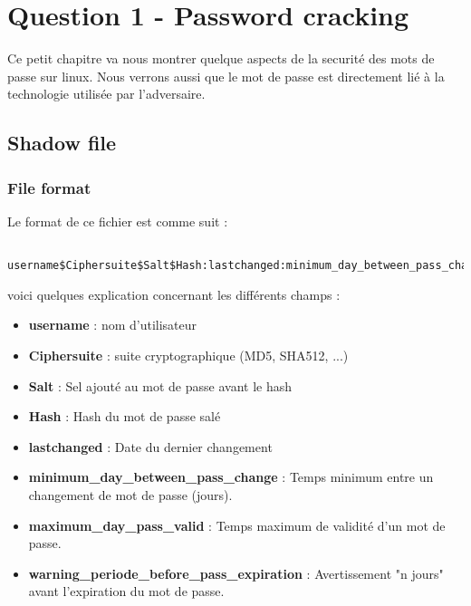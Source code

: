 
\chapter{Question 1 - Password cracking} %

\label{Chapitre 7.1} %



Ce petit chapitre va nous montrer quelque aspects de la securité des mots de passe sur linux. Nous verrons aussi que le mot de passe est directement lié à la technologie utilisée par l'adversaire.

\section{Shadow file}
\subsection{File format}
Le format de ce fichier est comme suit :
\begin{lstlisting}[frame=single,style=Console]  % Start your code-block

username$Ciphersuite$Salt$Hash:lastchanged:minimum_day_between_pass_change:maximum_day_pass_valid:warning_periode_before_pass_expiration:::
\end{lstlisting}

voici quelques explication concernant les différents champs :

\begin{itemize}
\item \textbf{username} : nom d'utilisateur
\item \textbf{Ciphersuite} : suite cryptographique (MD5, SHA512, ...)
\item \textbf{Salt} : Sel ajouté au mot de passe avant le hash
\item \textbf{Hash} : Hash du mot de passe salé 
\item \textbf{lastchanged} : Date du dernier changement
\item \textbf{minimum\_day\_between\_pass\_change} : Temps minimum entre un changement de mot de passe (jours).
\item \textbf{maximum\_day\_pass\_valid} : Temps maximum de validité d'un mot de passe.
\item \textbf{warning\_periode\_before\_pass\_expiration} : Avertissement "n jours" avant l'expiration du mot de passe.\\
\end{itemize}


